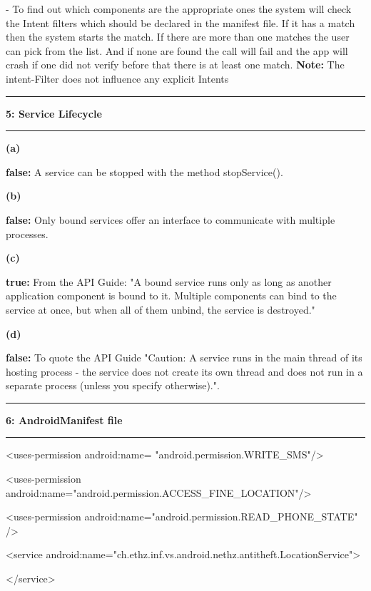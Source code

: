 \documentclass[11pt]{article}
\newcommand\question[2]{\vspace{.25in}\hrule\textbf{#1: #2}\vspace{.5em}\hrule\vspace{.10in}}
\renewcommand\part[1]{\vspace{.10in}\textbf{(#1)}}
\begin{document}
- To find out which components are the appropriate ones the system will check the Intent filters which should be declared in the manifest file.
If it has a match then the system starts the match. If there are more than one matches the user can pick from the list.
And if none are found the call will fail and the app will crash if one did not verify before that there is at least one match.\newline
\textbf{Note:} The intent-Filter does not influence any explicit Intents



\question{5}{Service Lifecycle} 

\part{a} 

\textbf{false:} A service can be stopped with the method stopService().

\part{b}

\textbf{false:} Only bound services offer an interface to communicate with multiple processes.

\part{c}

\textbf{true:} From the API Guide: "A bound service runs only as long as another application component is bound to it. Multiple components can bind to the service at once, but when all of them unbind, the service is destroyed."

\part{d}

\textbf{false:} To quote the API Guide "Caution: A service runs in the main thread of its hosting process - the service does not create its own thread and does not run in a separate process (unless you specify otherwise).".

\question{6}{AndroidManifest file}

 \textless uses-permission android:name= "android.permission.WRITE\_SMS"/\textgreater 
 
 
 \textless uses-permission android:name="android.permission.ACCESS\_FINE\_LOCATION"/\textgreater 
 
 
 \textless uses-permission android:name="android.permission.READ\_PHONE\_STATE" /\textgreater 
 
 \textless service android:name="ch.ethz.inf.vs.android.nethz.antitheft.LocationService"\textgreater 
	 
 \textless /service\textgreater 
\end{document}
